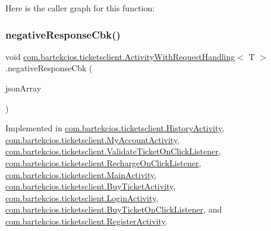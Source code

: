 Here is the caller graph for this function\+:
\mbox{\label{interfacecom_1_1bartekcios_1_1ticketsclient_1_1_activity_with_request_handling_a821409dd3783f82301349608daba40d5}} 
\subsubsection{\texorpdfstring{negative\+Response\+Cbk()}{negativeResponseCbk()}}
{\footnotesize\ttfamily void \hyperlink{interfacecom_1_1bartekcios_1_1ticketsclient_1_1_activity_with_request_handling}{com.\+bartekcios.\+ticketsclient.\+Activity\+With\+Request\+Handling}$<$ T $>$.negative\+Response\+Cbk (\begin{DoxyParamCaption}\item[{J\+S\+O\+N\+Array}]{json\+Array }\end{DoxyParamCaption})}



Implemented in \hyperlink{classcom_1_1bartekcios_1_1ticketsclient_1_1_history_activity_af5a8e26d1df9af3be59672b69d72b206}{com.\+bartekcios.\+ticketsclient.\+History\+Activity}, \hyperlink{classcom_1_1bartekcios_1_1ticketsclient_1_1_my_account_activity_a1daabfc4e737756c8bbe212d62a2fc15}{com.\+bartekcios.\+ticketsclient.\+My\+Account\+Activity}, \hyperlink{classcom_1_1bartekcios_1_1ticketsclient_1_1_validate_ticket_on_click_listener_a8991671fb5d7cabb5dcf4e9c162bbf2e}{com.\+bartekcios.\+ticketsclient.\+Validate\+Ticket\+On\+Click\+Listener}, \hyperlink{classcom_1_1bartekcios_1_1ticketsclient_1_1_recharge_on_click_listener_acc89f5bc094cd48c3c2bf60b78adf0e8}{com.\+bartekcios.\+ticketsclient.\+Recharge\+On\+Click\+Listener}, \hyperlink{classcom_1_1bartekcios_1_1ticketsclient_1_1_main_activity_a901a7f1fcf07f1d7381cf45e6800d8f5}{com.\+bartekcios.\+ticketsclient.\+Main\+Activity}, \hyperlink{classcom_1_1bartekcios_1_1ticketsclient_1_1_buy_ticket_activity_ab07afd1227834ee2ca9e4a27db9325d0}{com.\+bartekcios.\+ticketsclient.\+Buy\+Ticket\+Activity}, \hyperlink{classcom_1_1bartekcios_1_1ticketsclient_1_1_login_activity_a3527aa5a562d3ab3fcfc34e484585808}{com.\+bartekcios.\+ticketsclient.\+Login\+Activity}, \hyperlink{classcom_1_1bartekcios_1_1ticketsclient_1_1_buy_ticket_on_click_listener_a9b06a37be974fcbc0a1066ee86961775}{com.\+bartekcios.\+ticketsclient.\+Buy\+Ticket\+On\+Click\+Listener}, and \hyperlink{classcom_1_1bartekcios_1_1ticketsclient_1_1_register_activity_a113d57256d6e0e501b9c09f153bc42dc}{com.\+bartekcios.\+ticketsclient.\+Register\+Activity}.

